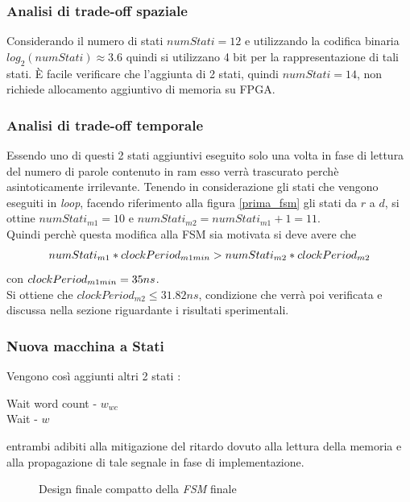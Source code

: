 \documentclass[11pt,a4paper]{article}
\begin{document}
            \subsubsection{Analisi di trade-off spaziale}
                Considerando il numero di stati $numStati = 12$ e utilizzando la codifica binaria $log_2(numStati) \approx 3.6$ quindi si utilizzano 4 bit per la rappresentazione di tali stati. È facile verificare che l'aggiunta di 2 stati, quindi $numStati = 14$, non richiede allocamento aggiuntivo di memoria su FPGA.
            \subsubsection{Analisi di trade-off temporale}
                Essendo uno di questi 2 stati aggiuntivi eseguito solo una volta in fase di lettura del numero di parole contenuto in ram esso verrà trascurato perchè asintoticamente irrilevante. Tenendo in considerazione gli stati che vengono eseguiti in \textit{loop}, facendo riferimento alla figura \ref{prima_fsm} gli stati da $r$ a $d$, si ottine $numStati_{m1} = 10$ e $numStati_{m2} =numStati_{m1} + 1= 11$.\\
                Quindi perchè questa modifica alla FSM sia motivata si deve avere che 
                \begin{gather*}
                    numStati_{m1} * clockPeriod_{m1 \space min} > numStati_{m2} * clockPeriod_{m2} 
                \end{gather*}
                con $clockPeriod_{m1 \space min} = 35 ns$.\\
                Si ottiene che $clockPeriod_{m2} \leq 31.82 ns$, condizione che verrà poi verificata e discussa nella sezione riguardante i risultati sperimentali.
            \subsubsection{Nuova macchina a Stati}
                Vengono così aggiunti altri 2 stati :
                \begin{description}
                    \item[Wait word count - $w_{wc}$]
                    \item[Wait - $w$]  
                \end{description}
                entrambi adibiti alla mitigazione del ritardo dovuto alla lettura della memoria e alla propagazione di tale segnale in fase di implementazione.
                \begin{figure}[h]
                    \centering
                    \begin{tikzpicture}[>=stealth',shorten >=1pt,auto,node distance=3cm,initial text =\texttt{Reset}]
                        
                    \end{tikzpicture}
                    \caption{Design finale compatto della \textit{FSM} finale}
                    \label{seconda_fsm}
                \end{figure}
\end{document}
